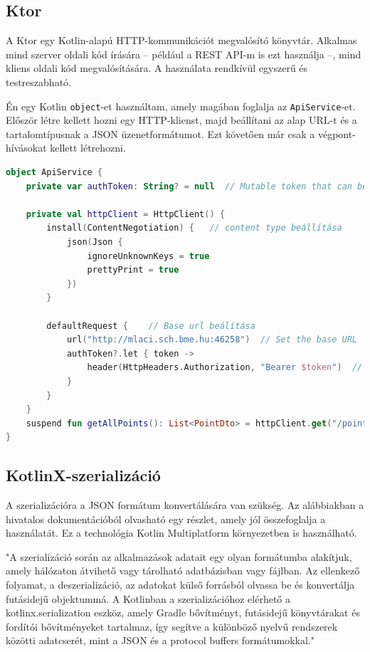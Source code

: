 \subsection{Ktor}
\label{sec:Ktor}

A Ktor egy Kotlin-alapú HTTP-kommunikációt megvalósító könyvtár\cite{Ktor}. Alkalmas mind szerver oldali kód írására – például a REST API-m is ezt használja –, mind kliens oldali kód megvalósítására.  
A használata rendkívül egyszerű és testreszabható.  

Én egy Kotlin \texttt{object}-et használtam, amely magában foglalja az \texttt{ApiService}-et.  
Először létre kellett hozni egy HTTP-klienst, majd beállítani az alap URL-t és a tartalomtípusnak a JSON üzenetformátumot.  
Ezt követően már csak a végpont-hívásokat kellett létrehozni.

\begin{lstlisting}[caption={Példa a Ktor használatára.}, label={lst:ktor}, language=Kotlin]
object ApiService {
    private var authToken: String? = null  // Mutable token that can be updated at runtime

    private val httpClient = HttpClient() {
        install(ContentNegotiation) {   // content type beállítása
            json(Json {
                ignoreUnknownKeys = true
                prettyPrint = true
            })
        }

        defaultRequest {    // Base url beálítása
            url("http://mlaci.sch.bme.hu:46258")  // Set the base URL
            authToken?.let { token ->
                header(HttpHeaders.Authorization, "Bearer $token")  // Add the Bearer token if it's not null
            }
        }
    }
    suspend fun getAllPoints(): List<PointDto> = httpClient.get("/point").body()    //végpontok
}
\end{lstlisting}

\subsection{KotlinX-szerializáció}
\label{sec:KotlinX}

A szerializációra a JSON formátum konvertálására van szükség. Az alábbiakban a hivatalos dokumentációból olvasható egy részlet, amely jól összefoglalja a használatát.  
Ez a technológia Kotlin Multiplatform környezetben is használható.

"A szerializáció során az alkalmazások adatait egy olyan formátumba alakítjuk, amely hálózaton átvihető vagy tárolható adatbázisban vagy fájlban. Az ellenkező folyamat, a deszerializáció, az adatokat külső forrásból olvassa be és konvertálja futásidejű objektummá. A Kotlinban a szerializációhoz elérhető a kotlinx.serialization eszköz, amely Gradle bővítményt, futásidejű könyvtárakat és fordítói bővítményeket tartalmaz, így segítve a különböző nyelvű rendszerek közötti adatcserét, mint a JSON és a protocol buffers formátumokkal."\cite{Serialization}


